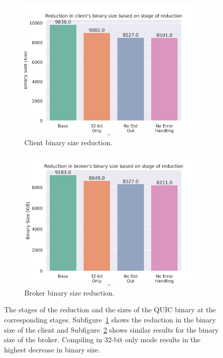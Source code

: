 \begin{figure}
    \begin{center}
        \begin{subfigure}[b]{1\textwidth}
            \includegraphics[width=1\linewidth]{images/quinn_binary_reduce_client.png}
            \caption{Client binary size reduction.}
            \label{fig:reduce_client}
        \end{subfigure}
        \begin{subfigure}[b]{1\textwidth}
            \includegraphics[width=1\linewidth]{images/quinn_binary_reduce_broker.png}
            \caption{Broker binary size reduction.}
            \label{fig:reduce_roker}
        \end{subfigure}
        \caption{The stages of the reduction and the sizes of the QUIC binary at the corresponding stages. Subfigure~\ref{fig:reduce_client} shows the reduction in the binary size of the client and Subfigure~\ref{fig:reduce_roker} shows similar results for the binary size of the broker.
        Compiling in 32-bit only mode results in the highest decrease in binary size.}
        \label{fig:reduce}
    \end{center}
\end{figure}

